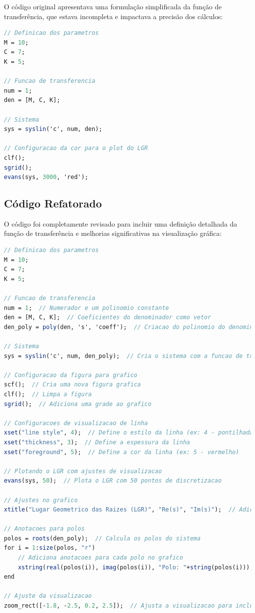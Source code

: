 \documentclass{article}
\begin{document}
O código original apresentava uma formulação simplificada da função de transferência, que estava incompleta e impactava a precisão dos cálculos:

\begin{lstlisting}[language=Scilab, caption=Código Scilab para simular o Lugar geométrico das raízes original]
// Definicao dos parametros
M = 10;
C = 7;
K = 5;

// Funcao de transferencia
num = 1;
den = [M, C, K];

// Sistema
sys = syslin('c', num, den);

// Configuracao da cor para o plot do LGR
clf();
sgrid();
evans(sys, 3000, 'red');
\end{lstlisting}

\subsection{Código Refatorado}

O código foi completamente revisado para incluir uma definição detalhada da função de transferência e melhorias significativas na visualização gráfica:

\begin{lstlisting}[language=Scilab, caption=Código Scilab para simular o Lugar geométrico das raízes refatorado]
// Definicao dos parametros
M = 10;
C = 7;
K = 5;

// Funcao de transferencia
num = 1;  // Numerador e um polinomio constante
den = [M, C, K];  // Coeficientes do denominador como vetor
den_poly = poly(den, 's', 'coeff');  // Criacao do polinomio do denominador com os coeficientes

// Sistema
sys = syslin('c', num, den_poly);  // Cria o sistema com a funcao de transferencia correta

// Configuracao da figura para grafico
scf();  // Cria uma nova figura grafica
clf();  // Limpa a figura
sgrid();  // Adiciona uma grade ao grafico

// Configuracoes de visualizacao de linha
xset("line style", 4);  // Define o estilo da linha (ex: 4 - pontilhada)
xset("thickness", 3);  // Define a espessura da linha
xset("foreground", 5);  // Define a cor da linha (ex: 5 - vermelho)

// Plotando o LGR com ajustes de visualizacao
evans(sys, 50);  // Plota o LGR com 50 pontos de discretizacao

// Ajustes no grafico
xtitle("Lugar Geometrico das Raizes (LGR)", "Re(s)", "Im(s)");  // Adiciona titulo e rotulos aos eixos

// Anotacoes para polos
polos = roots(den_poly);  // Calcula os polos do sistema
for i = 1:size(polos, "r")
    // Adiciona anotacoes para cada polo no grafico
    xstring(real(polos(i)), imag(polos(i)), "Polo: "+string(polos(i)));
end

// Ajuste da visualizacao
zoom_rect([-1.8, -2.5, 0.2, 2.5]);  // Ajusta a visualizacao para incluir os polos com zoom
\end{lstlisting}
\end{document}
